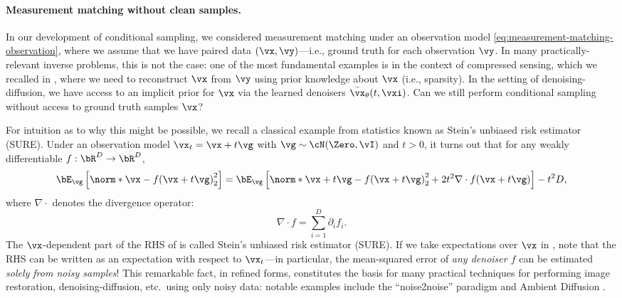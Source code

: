 \documentclass[../../book-main.tex]{subfiles}
\begin{document}
\paragraph{Measurement matching without clean samples.} In our development of
conditional sampling, we considered measurement matching under an observation
model \eqref{eq:measurement-matching-observation}, where we assume that we have
paired data $(\vx, \vy)$---i.e., ground truth for each observation $\vy$.
In many practically-relevant inverse problems, this is not the case: one of the
most fundamental examples is in the context of compressed sensing, which we
recalled in , where we need to reconstruct $\vx$ from $\vy$
using prior knowledge about $\vx$ (i.e., sparsity).
In the setting of denoising-diffusion, we have access to an implicit prior for
$\vx$ via the learned denoisers $\bar{\vx}_{\theta}(t, \vxi)$. Can we still perform 
conditional sampling without access to ground truth samples $\vx$?

For intuition as to why this might be possible, we recall a classical example
from statistics known as Stein's unbiased risk estimator (SURE).
Under an observation model $\vx_t = \vx + t \vg$ with $\vg \sim \cN(\Zero,
\vI)$ and $t>0$, it turns out that for any weakly differentiable $f : \bR^D \to \bR^D$,
\begin{equation}\label{eq:sure-risk}
  \bE_{\vg}\left[
    \norm*{\vx - f(\vx + t \vg)}_2^2
    \right]
  =
  \bE_{\vg}\left[
    \norm*{\vx+t\vg - f(\vx + t \vg)}_2^2
    + 2t^2 \nabla \cdot f(\vx + t\vg)
    \right]
  - t^2 D,
\end{equation}
where $\nabla \cdot$ denotes the divergence operator:
\begin{equation*}
	\nabla \cdot f = \sum_{i=1}^D \partial_i f_i.
\end{equation*}
The $\vx$-dependent part of the RHS of  is called Stein's unbiased risk
estimator (SURE). If we take expectations over $\vx$ in ,
note that the RHS can be written as an expectation with respect to $\vx_t$---in
particular, the mean-squared error of \textit{any denoiser $f$} can be estimated
\textit{solely from noisy samples}!
This remarkable fact, in refined forms, constitutes the basis for many practical
techniques for performing image restoration, denoising-diffusion, etc.\ using
only noisy data: notable examples include the ``noise2noise'' paradigm
\cite{pmlr-v80-lehtinen18a}
and Ambient Diffusion \cite{daras2023ambient}.
\end{document}
